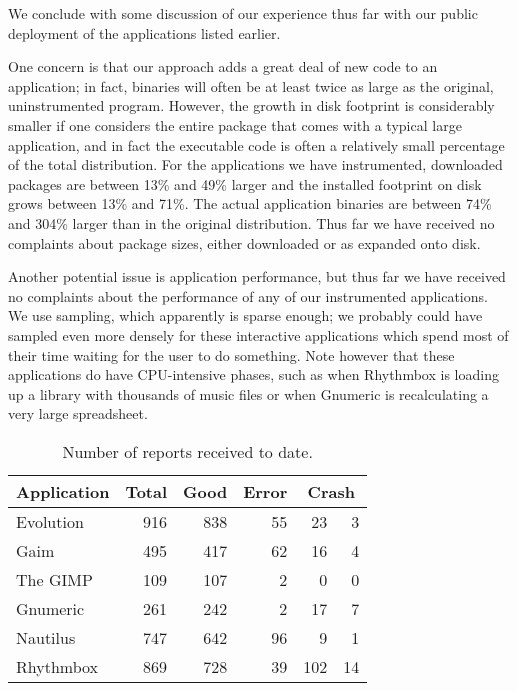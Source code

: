 \documentclass[10pt,twocolumn]{article}
\newcommand{\evolution}{Evolution\xspace}
\newcommand{\gaim}{Gaim\xspace}
\newcommand{\gimp}{The GIMP\xspace}
\newcommand{\gnumeric}{Gnumeric\xspace}
\newcommand{\nautilus}{Nautilus\xspace}
\newcommand{\rhythmbox}{Rhythmbox\xspace}
\newcommand{\header}[1]{\multicolumn{1}{c}{\textbf{#1}}}
\begin{document}
We conclude with some discussion of our experience thus far with our public
deployment of the applications listed earlier.

One concern is that our approach adds a great deal of new code
to an application; in fact, binaries will often be at least twice as
large as the original, uninstrumented program.  However, the growth in
disk footprint is considerably smaller if one considers the entire
package that comes with a typical large application, and in fact the
executable code is often a relatively small percentage of the total
distribution.  For the applications we have instrumented, downloaded
packages are between 13\% and 49\% larger and the installed footprint
on disk grows between 13\% and 71\%.  The actual application binaries
are between 74\% and 304\% larger than in the original distribution.
Thus far we have received no complaints about package sizes, either
downloaded or as expanded onto disk.

Another potential issue is application performance, but thus far we
have received no complaints about the performance of any of our
instrumented applications.  We use  sampling, which
apparently is sparse enough; we probably could have sampled even more
densely for these interactive applications which spend most of their
time waiting for the user to do something.  Note however that 
these applications do have CPU-intensive phases, such as when
\rhythmbox is loading up a library with thousands of music files or
when \gnumeric is recalculating a very large spreadsheet.

\begin{table}
  \centering
  \begin{tabular}{lrrrr@{\ (}r@{\%)}}
    \header{Application} & \header{Total} & \header{Good} & \header{Error} & \multicolumn{2}{c}{\textbf{Crash}} \\ \hline
    \evolution & 916 & 838 & 55 & 23 & 3 \\
    \gaim & 495 & 417 & 62 & 16 & 4 \\
    \gimp & 109 & 107 & 2 & 0 & 0 \\
    \gnumeric & 261 & 242 & 2 & 17 & 7 \\
    \nautilus & 747 & 642 & 96 & 9 & 1 \\
    \rhythmbox & 869 & 728 & 39 & 102 & 14
  \end{tabular}
  \caption{Number of reports received to date.}
  \label{reports-per-app}
\end{table}
\end{document}
